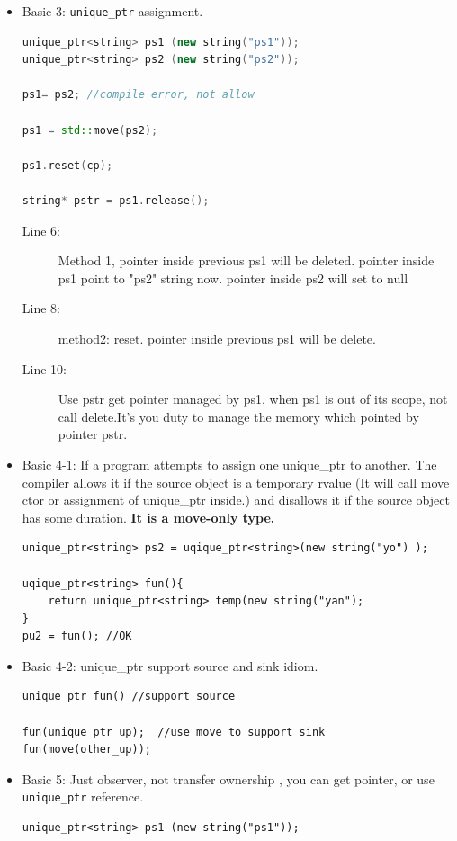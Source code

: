 \documentclass[a4paper,11pt,twoside]{book}
\begin{document}
\begin{itemize}
\item Basic 3: \texttt{unique\_ptr} assignment.
\begin{lstlisting}[frame=single, language=c++]
unique_ptr<string> ps1 (new string("ps1"));
unique_ptr<string> ps2 (new string("ps2"));

ps1= ps2; //compile error, not allow

ps1 = std::move(ps2);

ps1.reset(cp);

string* pstr = ps1.release();
\end{lstlisting}
\begin{description}
	\item[Line 6:] Method 1, pointer inside previous ps1 will be deleted. pointer inside ps1 point to "ps2" string now. pointer inside ps2 will set to null
	\item[Line 8:] method2: reset. pointer inside previous ps1 will be delete.
	\item[Line 10:] Use pstr get pointer managed by ps1. when ps1 is out of its scope, not call delete.It's you duty to manage the memory which pointed by pointer pstr.
\end{description} 

\item Basic 4-1: If a program attempts to assign one unique\_ptr to another. The compiler allows it if the source object is a temporary rvalue (It will call move ctor or assignment of unique\_ptr inside.) and disallows it if the source object has some duration. \textbf{It is a move-only type.}
\begin{lstlisting}[numbers=none]
unique_ptr<string> ps2 = uqique_ptr<string>(new string("yo") ); 

uqique_ptr<string> fun(){
	return unique_ptr<string> temp(new string("yan");
}
pu2 = fun(); //OK
\end{lstlisting}

\item Basic 4-2: unique\_ptr support source and sink idiom.
\begin{lstlisting}[numbers=none]
unique_ptr fun() //support source

fun(unique_ptr up);  //use move to support sink
fun(move(other_up));
\end{lstlisting}

\item Basic 5: Just observer, not transfer ownership , you can get pointer, or use \texttt{unique\_ptr} reference.
\begin{lstlisting}[numbers=none]
unique_ptr<string> ps1 (new string("ps1"));


\end{lstlisting}
\end{itemize}
\end{document}
